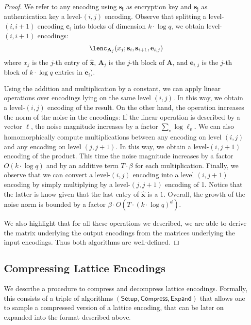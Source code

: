 \documentclass{theoretics}
\newcommand{\Compress}{\mathsf{Compress}}
\newcommand{\algofont}[1]{\ensuremath{\mathsf{#1}}}
\newcommand{\Setup}{{\algofont{Setup}}}
\newcommand{\Expand}{\algofont{Expand}}
\begin{document}
\begin{proof}
We refer to any encoding using $\mathbf{s_i}$ as encryption key and $\mathbf{s_j}$ as authentication key a level-$(i, j)$ encoding. Observe that splitting a level-$(i, i+1)$ encoding $\mathbf{c}_i$ into blocks of dimension $k\cdot \log q$, we obtain level-$(i, i+1)$ encodings: 
\[
\lenc_{\mathbf{A}_j}(x_j; \mathbf{s}_i, \mathbf{s}_{i+1}, \mathbf{e}_{i,j})
\]
where $x_j$ is the $j$-th entry of $\hat{\mathbf{x}}$, $\mathbf{A}_j$ is the $j$-th block of $\mathbf{A}$, and $\mathbf{e}_{i,j}$ is the $j$-th block of $k\cdot\log q$ entries in $\widetilde{\mathbf{e}}_{i}$).

Using the addition and multiplication by a constant, we can apply linear operations over encodings lying on the same level $(i, j)$. In this way, we obtain a level-$(i, j)$ encoding of the result. On the other hand, the operation increases the norm of the noise in the encodings: If the linear operation is described by a vector $\bm{\ell}$, the noise magnitude increases by a factor $\sum_{v} \log \ell_v$.
We can also homomorphically compute multiplications between any encoding on level $(i, j)$ and any encoding on level $(j, j+1)$. In this way, we obtain a level-$(i, j+1)$ encoding of the product. This time the noise magnitude increases by a factor $O(k\cdot \log q)$ and by an additive term $T\cdot \beta$ for each multiplication.
Finally, we observe that we can convert a level-$(i, j)$ encoding into a level $(i, j+1)$ encoding by simply multiplying by a level-$(j, j+1)$ encoding of 1. Notice that the latter is know given that the last entry of $\hat{\mathbf{x}}$ is a $1$.
Overall, the growth of the noise norm is bounded by a factor $\beta \cdot O(T \cdot (k\cdot \log q)^d)$.

We also highlight that for all these operations we described, we are able to derive the matrix underlying the output encodings from the matrices underlying the input encodings. Thus both algorithms are well-defined.
\end{proof}

\subsection{Compressing Lattice Encodings}\label{sec:comp_enc}

We describe a procedure to compress and decompress lattice encodings. Formally, this consists of a triple of algorithms $(\Setup, \Compress, \Expand)$ that allows one to sample a compressed version of a lattice encoding, that can be later on expanded into the format described above.
\end{document}
